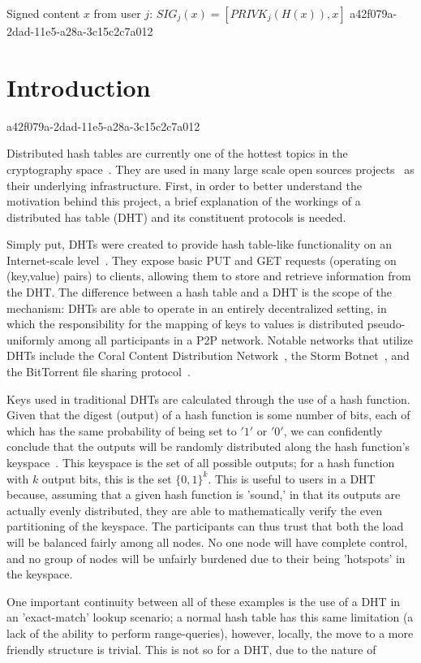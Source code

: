 \documentclass[12pt]{article}
\begin{document}
Signed content $x$ from user $j$: $SIG_j(x) = \left[ PRIVK_j( H(x) ), x \right]$
a42f079a-2dad-11e5-a28a-3c15c2c7a012
\section{Introduction}
a42f079a-2dad-11e5-a28a-3c15c2c7a012\par Distributed hash tables are currently one of the hottest topics in the cryptography space~\cite{Stoica:2001dj,Rowstron:2001ea,Ratnasamy:2001wn}. They are used in many large scale open sources projects~\cite{Freitas:2013tb,Xu:2010vs,Perfitt:2010fh} as their underlying infrastructure. First, in order to better understand the motivation behind this project, a brief explanation of the workings of a distributed has table (DHT) and its constituent protocols is needed.

\par Simply put, DHTs were created to provide hash table-like functionality on an Internet-scale level~\cite{Ratnasamy:2001wn}. They expose basic PUT and GET requests (operating on (key,value) pairs) to clients, allowing them to store and retrieve information from the DHT. The difference between a hash table and a DHT is the scope of the mechanism: DHTs are able to operate in an entirely decentralized setting, in which the responsibility for the mapping of keys to values is distributed pseudo-uniformly among all participants in a P2P network. Notable networks that utilize DHTs include the Coral Content Distribution Network~\cite{Freedman:2004vb}, the Storm Botnet~\cite{Holz:2008uk}, and the BitTorrent file sharing protocol~\cite{Cohen:y1_8mBnw}.

\par Keys used in traditional DHTs are calculated through the use of a hash function. Given that the digest (output) of a hash function is some number of bits, each of which has the same probability of being set to $'1'$ or $'0'$, we can confidently conclude that the outputs will be randomly distributed along the hash function's keyspace~. This keyspace is the set of all possible outputs; for a hash function with $k$ output bits, this is the set $\{0,1\}^k$. This is useful to users in a DHT because, assuming that a given hash function is 'sound,' in that its outputs are actually evenly distributed, they are able to mathematically verify the even partitioning of the keyspace. The participants can thus trust that both the load will be balanced fairly among all nodes. No one node will have complete control, and no group of nodes will be unfairly burdened due to their being 'hotspots' in the keyspace.~

\par One important continuity between all of these examples is the use of a DHT in an 'exact-match' lookup scenario; a normal hash table has this same limitation (a lack of the ability to perform range-queries), however, locally, the move to a more friendly structure is trivial. This is not so for a DHT, due to the nature of
\printbibliography
\end{document}
